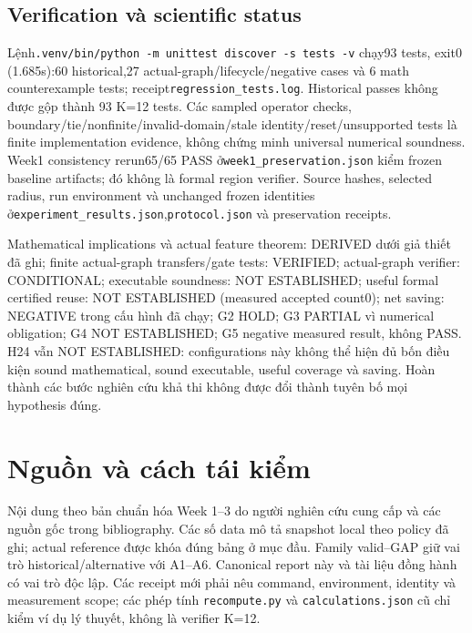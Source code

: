 \documentclass[11pt,a4paper]{article}
\newcommand{\code}[1]{{\small\ttfamily\nolinkurl{#1}}}
\theoremstyle{remark}
\begin{document}
\subsection{Verification và scientific status}
Lệnh\code{.venv/bin/python -m unittest discover -s tests -v} chạy93 tests,
exit0 (1.685s):60 historical,27 actual-graph/lifecycle/negative cases và 6
math counterexample tests; receipt\code{regression_tests.log}. Historical
passes không được gộp thành 93 K=12 tests. Các sampled operator checks,
boundary/tie/nonfinite/invalid-domain/stale identity/reset/unsupported tests
là finite implementation evidence, không chứng minh universal numerical
soundness. Week1 consistency rerun65/65 PASS ở\code{week1_preservation.json}
kiểm frozen baseline artifacts; đó không là formal region verifier.
Source hashes, selected radius, run environment và unchanged frozen identities
ở\code{experiment_results.json},\code{protocol.json} và preservation receipts.

Mathematical implications và actual feature theorem: DERIVED dưới giả thiết
đã ghi; finite actual-graph transfers/gate tests: VERIFIED; actual-graph
verifier: CONDITIONAL; executable soundness: NOT ESTABLISHED; useful formal
certified reuse: NOT ESTABLISHED (measured accepted count0); net saving:
NEGATIVE trong cấu hình đã chạy; G2 HOLD; G3 PARTIAL vì numerical obligation;
G4 NOT ESTABLISHED; G5 negative measured result, không PASS.
H24 vẫn NOT ESTABLISHED: configurations này không thể hiện đủ bốn điều kiện
sound mathematical, sound executable, useful coverage và saving. Hoàn thành
các bước nghiên cứu khả thi không được đổi thành tuyên bố mọi hypothesis đúng.


\section*{Nguồn và cách tái kiểm}
Nội dung theo bản chuẩn hóa Week 1--3 do người nghiên cứu cung cấp và các
nguồn gốc trong bibliography. Các số data mô tả snapshot local theo policy
đã ghi; actual reference được khóa đúng bảng ở mục đầu. Family valid--GAP giữ
vai trò historical/alternative với A1--A6. Canonical report này và tài liệu
đồng hành có vai trò độc lập. Các receipt mới phải nêu command, environment,
identity và measurement scope; các phép tính \code{recompute.py} và
\code{calculations.json} cũ chỉ kiểm ví dụ lý thuyết, không là verifier K=12.
\end{document}
